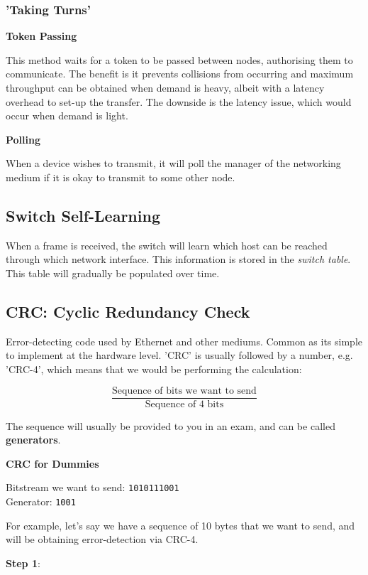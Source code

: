 \documentclass{article}
\begin{document}
\subsubsection{'Taking Turns'}

\textbf{Token Passing}

This method waits for a token to be passed between nodes, authorising them to communicate. The benefit is it prevents collisions from occurring and maximum throughput can be obtained when demand is heavy, albeit with a latency overhead to set-up the transfer. The downside is the latency issue, which would occur when demand is light.

\textbf{Polling}

When a device wishes to transmit, it will poll the manager of the networking medium if it is okay to transmit to some other node.

\subsection{Switch Self-Learning}

When a frame is received, the switch will learn which host can be reached through which network interface. This information is stored in the \textit{switch table}. This table will gradually be populated over time.

\subsection{CRC: Cyclic Redundancy Check}

Error-detecting code used by Ethernet and other mediums. Common as its simple to implement at the hardware level. 'CRC' is usually followed by a number, e.g. 'CRC-4', which means that we would be performing the calculation:

\[
\frac{\text{Sequence of bits we want to send}}{\text{Sequence of 4 bits}}
\]

The sequence will usually be provided to you in an exam, and can be called \textbf{generators}.

\newpage
\large\textbf{CRC for Dummies}

Bitstream we want to send: \texttt{1010111001}\\
Generator: \texttt{1001}

For example, let's say we have a sequence of 10 bytes that we want to send, and will be obtaining error-detection via CRC-4.

\textbf{Step 1}:
\end{document}
